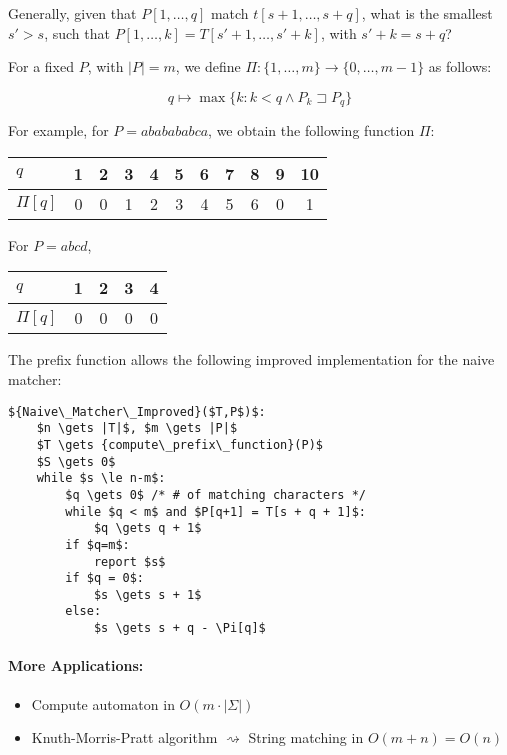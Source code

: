 Generally, given that $P[1,\ldots,q]$ match $t[s+1,\ldots, s+q]$, what is the smallest $s' > s$, such that $P[1, \ldots, k] = T[s'+1, \ldots, s'+k]$, with $s' + k = s + q$?

\begin{mydefinition}
	For a fixed $P$, with $|P|=m$, we define $\Pi: \{1, \ldots, m\} \rightarrow \{0, \ldots, m-1\}$ as follows:
	
	$$q \mapsto \max \{k : k < q \wedge P_k \sqsupset P_q\}$$
\end{mydefinition}

For example, for $P = ababababca$, we obtain the following function $\Pi$:

\begin{tabular}{l|cccccccccc}
  $q$ & 1 & 2 & 3 & 4 & 5 & 6 & 7 & 8 & 9 & 10 \\
  \hline
  $\Pi[q]$ & 0 & 0 & 1 & 2 & 3 & 4 & 5 & 6 & 0 & 1 
\end{tabular}

\bigskip

For $P=abcd$,

\begin{tabular}{l|cccc}
  $q$ & 1 & 2 & 3 & 4 \\
  \hline
  $\Pi[q]$ & 0 & 0 & 0 & 0 
\end{tabular}

\bigskip

\noindent The prefix function allows the following improved implementation for the naive matcher:

\newpage

\begin{lstlisting}[mathescape]
${Naive\_Matcher\_Improved}($T,P$)$:
	$n \gets |T|$, $m \gets |P|$
	$T \gets {compute\_prefix\_function}(P)$
	$S \gets 0$
	while $s \le n-m$:
		$q \gets 0$ /* # of matching characters */
		while $q < m$ and $P[q+1] = T[s + q + 1]$:
			$q \gets q + 1$
		if $q=m$:
			report $s$
		if $q = 0$:
			$s \gets s + 1$
		else:
			$s \gets s + q - \Pi[q]$
\end{lstlisting}

\paragraph{More Applications:}
\begin{itemize}
	\item Compute automaton in $O(m \cdot |\Sigma|)$
	\item Knuth-Morris-Pratt algorithm $\rightsquigarrow$ String matching in $O(m+n) = O(n)$
\end{itemize}


